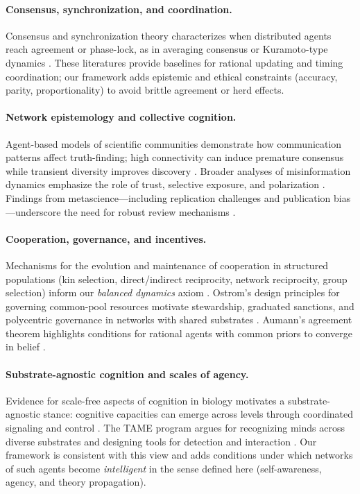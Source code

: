 \documentclass[12pt]{article}
\begin{document}
\paragraph{Consensus, synchronization, and coordination.}
Consensus and synchronization theory characterizes when distributed agents reach agreement or phase-lock, as in averaging consensus or Kuramoto-type dynamics \citep{OlfatiSaber2007}. These literatures provide baselines for rational updating and timing coordination; our framework adds epistemic and ethical constraints (accuracy, parity, proportionality) to avoid brittle agreement or herd effects.

\paragraph{Network epistemology and collective cognition.}
Agent-based models of scientific communities demonstrate how communication patterns affect truth-finding; high connectivity can induce premature consensus while transient diversity improves discovery \citep{Zollman2010}. Broader analyses of misinformation dynamics emphasize the role of trust, selective exposure, and polarization \citep{OConnorWeatherall2019}. Findings from metascience---including replication challenges and publication bias---underscore the need for robust review mechanisms \citep{Ioannidis2005}.

\paragraph{Cooperation, governance, and incentives.}
Mechanisms for the evolution and maintenance of cooperation in structured populations (kin selection, direct/indirect reciprocity, network reciprocity, group selection) inform our \emph{balanced dynamics} axiom \citep{Nowak2006}. Ostrom’s design principles for governing common-pool resources motivate stewardship, graduated sanctions, and polycentric governance in networks with shared substrates \citep{Ostrom1990}. Aumann’s agreement theorem highlights conditions for rational agents with common priors to converge in belief \citep{Aumann1976}.

\paragraph{Substrate-agnostic cognition and scales of agency.}
Evidence for scale-free aspects of cognition in biology motivates a substrate-agnostic stance: cognitive capacities can emerge across levels through coordinated signaling and control \citep{Levin2019}. The TAME program argues for recognizing minds across diverse substrates and designing tools for detection and interaction \citep{TAME2021}. Our framework is consistent with this view and adds conditions under which networks of such agents become \emph{intelligent} in the sense defined here (self-awareness, agency, and theory propagation).
\end{document}
